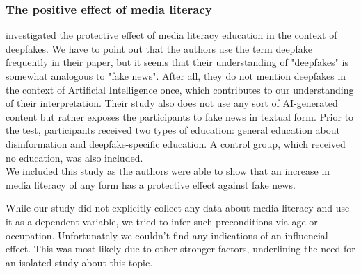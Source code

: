 \documentclass[
  a4paper,  %
  twoside,  %
  bibliography=totoc,
  headsepline,
  cleardoublepage=empty,
  parskip=half,
  draft=false
]{scrbook}
\begin{document}
\subsubsection*{The positive effect of media literacy}
\citeauthor{hwangEffectsDisinformationUsing2021} investigated the protective effect of media literacy education in the context of deepfakes. We have to point out that the authors use the term deepfake frequently in their paper, but it seems that their understanding of "deepfakes" is somewhat analogous to "fake news". After all, they do not mention deepfakes in the context of Artificial Intelligence once, which contributes to our understanding of their interpretation. Their study also does not use any sort of AI-generated content but rather exposes the participants to fake news in textual form. Prior to the test, participants received two types of education: general education about disinformation and deepfake-specific education. A control group, which received no education, was also included. \\
We included this study as the authors were able to show that an increase in media literacy of any form has a protective effect against fake news.

While our study did not explicitly collect any data about media literacy and use it as a dependent variable, we tried to infer such preconditions via age or occupation. Unfortunately we couldn't find any indications of an influencial effect. This was most likely due to other stronger factors, underlining the need for an isolated study about this topic.
\end{document}
